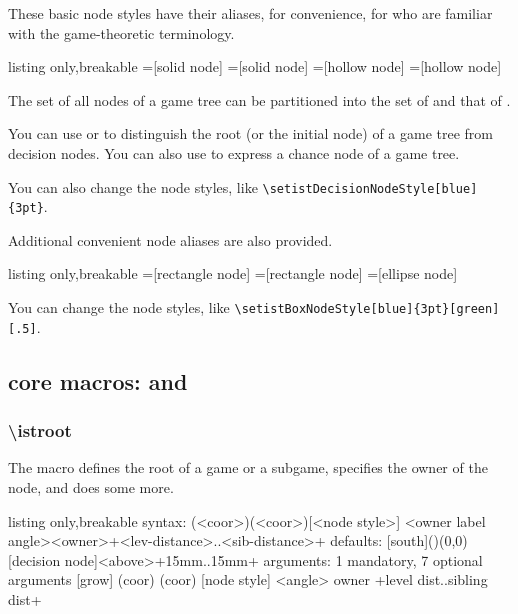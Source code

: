 These basic node styles have their aliases, for convenience, for who are familiar with the game-theoretic terminology.

\begin{tcblisting}{listing only,breakable}
=[solid node]  %
=[solid node]  %
=[hollow node]
=[hollow node]
\end{tcblisting}

The set of all nodes of a game tree can be partitioned into
the set of  and that of .

You can use  or 
to distinguish the root (or the initial node) of a game tree from decision nodes.
You can also use  to express a chance node of a game tree.

You can also change the node styles, like
\verb|\setistDecisionNodeStyle[blue]{3pt}|.

Additional convenient node aliases are also provided. 

\begin{tcblisting}{listing only,breakable}
=[rectangle node]
=[rectangle node]
=[ellipse node]
\end{tcblisting}

You can change the node styles, like \verb|\setistBoxNodeStyle[blue]{3pt}[green][.5]|.

\subsection{core macros: \protect\cmd{\istroot} and \protect\cmd{\istb}}

\subsubsection*{\textbackslash istroot}

The macro \cmd{\istroot} defines the root of a game or a subgame, specifies the owner of the node, and does some more.

\begin{tcblisting}{listing only,breakable}
syntax: (<coor>)(<coor>)[<node style>]%
            <owner label angle>{<owner>}+<lev-distance>..<sib-distance>+
defaults: [south]()(0,0)[decision node]<above>{}+15mm..15mm+
arguments: 1 mandatory, 7 optional arguments
  [grow] %
  (coor) %
  (coor) %
  [node style] %
  <angle> %
  {owner} %
  +level dist..sibling dist+ %
\end{tcblisting}

